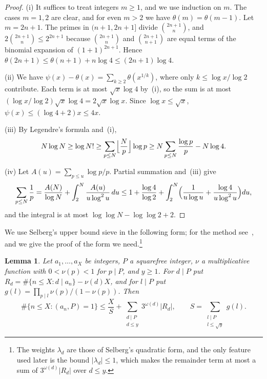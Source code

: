 \documentclass[screen,reqno]{aomart}
\numberwithin{equation}{section}
\newtheorem{lemma}[theorem]{Lemma}
\theoremstyle{definition}
\begin{document}
\begin{proof}
(i) It suffices to treat integers $m\ge1$, and we use induction on $m$. The cases $m=1,2$ are
clear, and for even $m>2$ we have $\theta(m)=\theta(m-1)$. Let $m=2n+1$. The primes in
$(n+1,2n+1]$ divide $\binom{2n+1}n$, and $2\binom{2n+1}n\le2^{2n+1}$ because $\binom{2n+1}n$ and
$\binom{2n+1}{n+1}$ are equal terms of the binomial expansion of $(1+1)^{2n+1}$. Hence
$\theta(2n+1)\le\theta(n+1)+n\log4\le(2n+1)\log4$.

(ii) We have $\psi(x)-\theta(x)=\sum_{k\ge2}\theta(x^{1/k})$, where only $k\le\log x/\log2$
contribute. Each term is at most $\sqrt x\log4$ by~(i), so the sum is at most
$(\log x/\log2)\sqrt x\log4=2\sqrt x\log x$. Since $\log x\le\sqrt x$, $\psi(x)\le(\log4+2)x\le4x$.

(iii) By Legendre's formula and~(i),
\[
  N\log N\ge\log N!\ge\sum_{p\le N}\Bigl\lfloor\frac Np\Bigr\rfloor\log p
  \ge N\sum_{p\le N}\frac{\log p}p-N\log4.
\]

(iv) Let $A(u)=\sum_{p\le u}\log p/p$. Partial summation and~(iii) give
\[
  \sum_{p\le N}\frac1p=\frac{A(N)}{\log N}+\int_2^N\frac{A(u)}{u\log^2u}\,du
  \le1+\frac{\log4}{\log2}+\int_2^N\Bigl(\frac1{u\log u}+\frac{\log4}{u\log^2u}\Bigr)du,
\]
and the integral is at most $\log\log N-\log\log2+2$.
\end{proof}

We use Selberg's upper bound sieve in the following form; for the method
see~\cite[Chapter~3]{HR74}, and we give the proof of the form we need.\footnote{The weights
$\lambda_d$ are those of Selberg's quadratic form, and the only feature used later is the bound
$|\lambda_d|\le1$, which makes the remainder term at most a sum of $3^{\omega(d)}|R_d|$ over
$d\le y$.}

\begin{lemma}\label{lem:selberg}
Let $a_1,\dots,a_X$ be integers, $P$ a squarefree integer, $\nu$ a multiplicative function with
$0<\nu(p)<1$ for $p\mid P$, and $y\ge1$. For $d\mid P$ put
$R_d=\#\{n\le X:d\mid a_n\}-\nu(d)X$, and for $l\mid P$ put
$g(l)=\prod_{p\mid l}\nu(p)/(1-\nu(p))$. Then
\[
  \#\{n\le X:(a_n,P)=1\}\le\frac XS+\sum_{\substack{d\mid P\\d\le y}}3^{\omega(d)}|R_d|,
  \qquad S=\sum_{\substack{l\mid P\\l\le\sqrt y}}g(l).
\]
\end{lemma}
\end{document}
